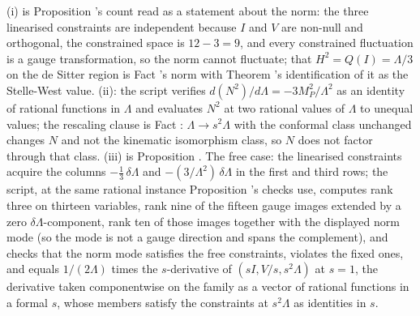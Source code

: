(i) is Proposition 's count read as a statement about the norm: the three linearised constraints are independent because $I$ and $V$ are non-null and orthogonal, the constrained space is $12 - 3 = 9$, and every constrained fluctuation is a gauge transformation, so the norm cannot fluctuate; that $H^2 = Q(I) = \Lambda/3$ on the de Sitter region is Fact 's norm with Theorem 's identification of it as the Stelle-West value. (ii): the script verifies $d(N^2)/d\Lambda = -3M_P^2/\Lambda^2$ as an identity of rational functions in $\Lambda$ and evaluates $N^2$ at two rational values of $\Lambda$ to unequal values; the rescaling clause is Fact : $\Lambda \to s^2\Lambda$ with the conformal class unchanged changes $N$ and not the kinematic isomorphism class, so $N$ does not factor through that class. (iii) is Proposition . The free case: the linearised constraints acquire the columns $-\tfrac13\,\delta\Lambda$ and $-(3/\Lambda^2)\,\delta\Lambda$ in the first and third rows; the script, at the same rational instance Proposition 's checks use, computes rank three on thirteen variables, rank nine of the fifteen gauge images extended by a zero $\delta\Lambda$-component, rank ten of those images together with the displayed norm mode (so the mode is not a gauge direction and spans the complement), and checks that the norm mode satisfies the free constraints, violates the fixed ones, and equals $1/(2\Lambda)$ times the $s$-derivative of $(sI, V/s, s^2\Lambda)$ at $s = 1$, the derivative taken componentwise on the family as a vector of rational functions in a formal $s$, whose members satisfy the constraints at $s^2\Lambda$ as identities in $s$.
